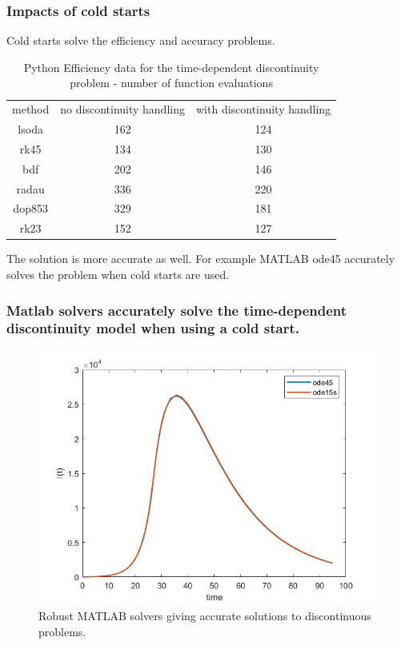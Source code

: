 \documentclass{beamer}
\begin{document}
\begin{frame}
\frametitle{Impacts of cold starts}
Cold starts solve the efficiency and accuracy problems.
\begin{table}[H]
\caption {Python Efficiency data for the time-dependent discontinuity problem - number of function evaluations} 
\label{tab:time_discontinuity_Py} 
\begin{center}
\begin{tabular}{ c c c }
method & no discontinuity handling & with discontinuity handling \\ 
lsoda & 162 & 124 \\
rk45 & 134 & 130 \\
bdf & 202 & 146 \\
radau & 336 & 220 \\
dop853 & 329 & 181 \\
rk23 & 152 & 127 \\
\end{tabular}
\end{center}
\end{table}
The solution is more accurate as well. For example MATLAB ode45 accurately solves the problem when cold starts are used.
\end{frame}

\begin{frame}
\frametitle{Matlab solvers accurately solve the time-dependent discontinuity model when using a cold start.}
\begin{figure}[H]
\centering
\includegraphics[width=0.7\linewidth]{./figures/solve_time_discontinuity_matlab}
\caption{Robust MATLAB solvers giving accurate solutions to discontinuous problems.}
\label{fig:solve_time_discontinuity_matlab}
\end{figure}
\end{frame}
\end{document}
